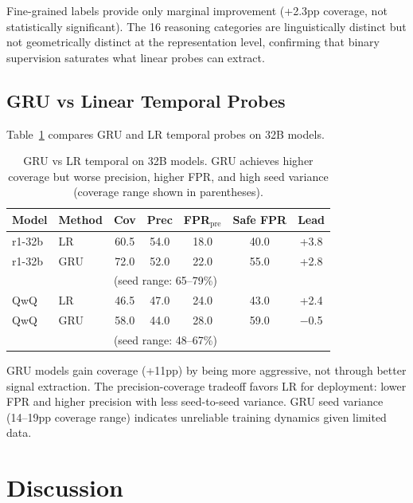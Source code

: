\documentclass[11pt,a4paper]{article}
\begin{document}
Fine-grained labels provide only marginal improvement (+2.3pp coverage, not statistically significant). The 16 reasoning categories are linguistically distinct but not geometrically distinct at the representation level, confirming that binary supervision saturates what linear probes can extract.

\subsection{GRU vs Linear Temporal Probes}

Table~\ref{tab:gru} compares GRU and LR temporal probes on 32B models.

\begin{table}[t]
\centering
\small
\caption{GRU vs LR temporal on 32B models. GRU achieves higher coverage but worse precision, higher FPR, and high seed variance (coverage range shown in parentheses).}
\label{tab:gru}
\begin{tabular}{llccccc}
\toprule
Model & Method & Cov & Prec & FPR$_\text{pre}$ & Safe FPR & Lead \\
\midrule
r1-32b & LR & 60.5 & 54.0 & 18.0 & 40.0 & +3.8 \\
r1-32b & GRU & 72.0 & 52.0 & 22.0 & 55.0 & +2.8 \\
 & & \multicolumn{5}{l}{\small(seed range: 65--79\%)} \\
\midrule
QwQ & LR & 46.5 & 47.0 & 24.0 & 43.0 & +2.4 \\
QwQ & GRU & 58.0 & 44.0 & 28.0 & 59.0 & $-$0.5 \\
 & & \multicolumn{5}{l}{\small(seed range: 48--67\%)} \\
\bottomrule
\end{tabular}
\end{table}

GRU models gain coverage (+11pp) by being more aggressive, not through better signal extraction. The precision-coverage tradeoff favors LR for deployment: lower FPR and higher precision with less seed-to-seed variance. GRU seed variance (14--19pp coverage range) indicates unreliable training dynamics given limited data.

\section{Discussion}
\end{document}
